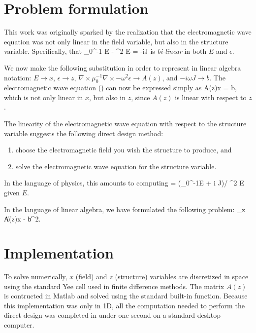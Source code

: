 \section{Problem formulation}
This work was originally sparked by the realization that 
    the electromagnetic wave equation was not only linear in the field variable,
    but also in the structure variable.
Specifically, that
    \BE \nabla \times \mu_0^{-1} \nabla \times E - \omega^2 \epsilon E = 
        -i\omega J \label{p1:wave} \EE
    is \emph{bi-linear} in both $E$ and $\epsilon$.

We now make the following substitution in order to represent 
    in linear algebra notation:
    \BI $E \to x$, 
    \I  $\epsilon \to z$,
    \I  $\nabla\times\mu_0^{-1}\nabla\times - \omega^2 \epsilon \to A(z)$, and
    \I  $-i\omega J \to b$. \EI
The electromagnetic wave equation () can now be expressed simply as
    \BE A(z)x = b, \label{p1:axb} \EE
    which is not only linear in $x$, but also in $z$, 
    since $A(z)$ is linear with respect to $z$.

The linearity of the electromagnetic wave equation with respect to
    the structure variable suggests the following direct design method:
    \begin{enumerate}
    \item choose the electromagnetic field you wish the structure to produce, and
    \item solve the electromagnetic wave equation for the structure variable. 
    \end{enumerate}

In the language of physics, this amounts to computing
    \BE \epsilon = (\nabla\times\mu_0^{-1}\nabla\times E + 
        i \omega J)/ \omega^2 E \EE
    given $E$. 

In the language of linear algebra, we have formulated the following problem:
    \BE \minimize_z \|A(z)x - b\|^2. \label{p1:problem}\EE
    
\section{Implementation}
To solve  numerically, $x$ (field) and $z$ (structure) variables
    are discretized in space using the standard Yee cell 
    used in finite difference methods\cite{Yee66}. 
The matrix $A(z)$ is contructed in Matlab and solved using 
    the standard built-in function.
Because this implementation was only in 1D,
    all the computation needed to perform the direct design
    was completed in under one second 
    on a standard desktop computer.

